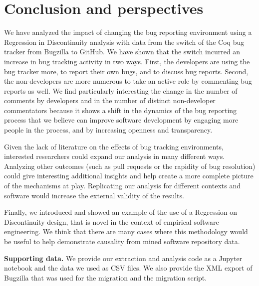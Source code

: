 \documentclass[conference]{IEEEtran}
\begin{document}
\section{Conclusion and perspectives}
\label{conclusion}
We have analyzed the impact of changing the bug reporting environment using a Regression in Discontinuity analysis with data from the switch of the Coq bug tracker from Bugzilla to GitHub.  We have shown that the switch incurred an increase in bug tracking activity in two ways. First, the developers are using the bug tracker more, to report their own bugs, and to discuss bug reports. Second, the non-developers are more numerous to take an active role by commenting bug reports as well. We find particularly interesting the change in the number of comments by developers and in the number of distinct non-developer commentators because it shows a shift in the dynamics of the bug reporting process that we believe can improve software development by engaging more people in the process, and by increasing openness and transparency.

Given the lack of literature on the effects of bug tracking environments, interested researchers could expand our analysis in many different ways. Analyzing other outcomes (such as pull requests or the rapidity of bug resolution) could give interesting additional insights and help create a more complete picture of the mechanisms at play.
Replicating our analysis for different contexts and software would increase the external validity of the results.

Finally, we introduced and showed an example of the use of a Regression on Discontinuity design, that is novel in the context of empirical software engineering. We think that there are many cases where this methodology would be useful to help demonstrate causality from mined software repository data.


\scriptsize
\noindent \footnotesize{\textbf{Supporting data.}}
We provide our extraction and analysis code as a Jupyter notebook and the data we used as CSV files. We also provide the XML export of Bugzilla that was used for the migration and the migration script.
\end{document}

